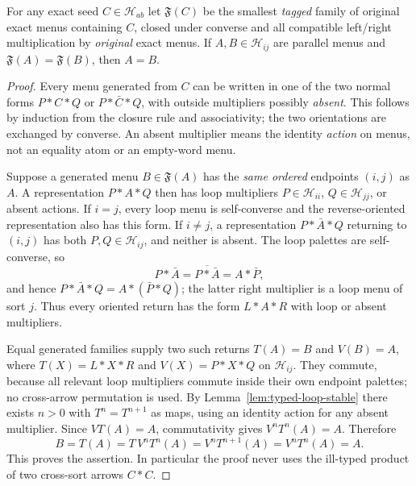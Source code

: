 \begin{lemma}
\label{lem:typed-no-return}
For any exact seed $C\in\mathcal H_{ab}$ let
$\mathfrak F(C)$ be the smallest \emph{tagged} family of original
exact menus containing $C$, closed under converse and all
compatible left/right multiplication by \emph{original} exact
menus.  If $A,B\in\mathcal H_{ij}$ are parallel menus and
$\mathfrak F(A)=\mathfrak F(B)$, then $A=B$.
\end{lemma}
\begin{proof}
Every menu generated from $C$ can be written in one of the two
normal forms
$P*C*Q$ or $P*\bar C*Q$, with outside multipliers
possibly \emph{absent}.  This follows by induction from the
closure rule and associativity; the two orientations are exchanged
by converse.  An absent multiplier means the identity \emph{action}
on menus, not an equality atom or an empty-word menu.

Suppose a generated menu $B\in\mathfrak F(A)$ has the \emph{same
ordered} endpoints $(i,j)$ as $A$.  A representation
$P*A*Q$ then has loop multipliers $P\in\mathcal H_{ii}$,
$Q\in\mathcal H_{jj}$, or absent actions.  If $i=j$, every loop
menu is self-converse and the reverse-oriented representation also
has this form.  If $i\ne j$, a representation
$P*\bar A*Q$ returning to $(i,j)$ has both
$P,Q\in\mathcal H_{ij}$, and neither is absent.  The loop
palettes are self-converse, so
\begin{equation}\label{eq:parallel-switch}
 P*\bar A=\overline{P*\bar A}=A*\bar P,
\end{equation}
and hence $P*\bar A*Q=A*(\bar P*Q)$; the latter right
multiplier is a loop menu of sort $j$.  Thus every oriented return
has the form $L*A*R$ with loop or absent multipliers.

Equal generated families supply two such returns
$T(A)=B$ and $V(B)=A$, where
$T(X)=L*X*R$ and $V(X)=P*X*Q$ on $\mathcal H_{ij}$.
They commute, because all relevant loop multipliers commute
inside their own endpoint palettes; no cross-arrow permutation is
used.  By Lemma~\ref{lem:typed-loop-stable} there exists $n>0$
with $T^n=T^{n+1}$ as maps, using an identity action for any
absent multiplier.  Since $VT(A)=A$, commutativity gives
$V^nT^n(A)=A$.  Therefore
\[
 B=T(A)=T\,V^nT^n(A)
       =V^nT^{n+1}(A)=V^nT^n(A)=A.
\]
This proves the assertion.  In particular the proof never uses the
ill-typed product of two cross-sort arrows $C*C$.
\end{proof}

